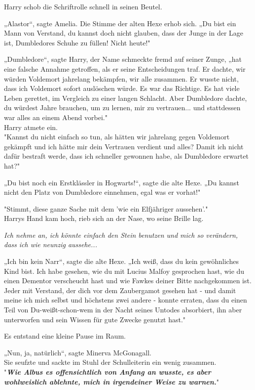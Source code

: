 {Harry schob die Schriftrolle schnell in seinen Beutel.

„Alastor“, sagte Amelia. Die Stimme der alten Hexe erhob sich. „Du bist ein Mann von Verstand, du kannst doch nicht glauben, dass der Junge in der Lage ist, Dumbledores Schuhe zu füllen! Nicht heute!"

„Dumbledore“, sagte Harry, der Name schmeckte fremd auf seiner Zunge, „hat eine falsche Annahme getroffen, als er seine Entscheidungen traf. Er dachte, wir würden Voldemort jahrelang bekämpfen, wir alle zusammen. Er wusste nicht, dass ich Voldemort sofort auslöschen würde. Es war das Richtige. Es hat viele Leben gerettet, im Vergleich zu einer langen Schlacht. Aber Dumbledore dachte, du würdest Jahre brauchen, um zu lernen, mir zu vertrauen... und stattdessen war alles an einem Abend vorbei."\\ Harry atmete ein.\\ "Kannst du nicht einfach so tun, als hätten wir jahrelang gegen Voldemort gekämpft und ich hätte mir dein Vertrauen verdient und alles? Damit ich nicht dafür bestraft werde, dass ich schneller gewonnen habe, als Dumbledore erwartet hat?"

„Du bist noch ein Erstklässler in Hogwarts!“, sagte die alte Hexe. „Du kannst nicht den Platz von Dumbledore einnehmen, egal was er vorhat!"

"Stimmt, diese ganze Sache mit dem 'wie ein Elfjähriger aussehen'."\\ Harrys Hand kam hoch, rieb sich an der Nase, wo seine Brille lag.

\emph{Ich nehme an, ich könnte einfach den Stein benutzen und mich so verändern, dass ich wie neunzig aussehe...}

„Ich bin kein Narr“, sagte die alte Hexe. „Ich weiß, dass du kein gewöhnliches Kind bist. Ich habe gesehen, wie du mit Lucius Malfoy gesprochen hast, wie du einen Dementor verscheucht hast und wie Fawkes deiner Bitte nachgekommen ist.\\ Jeder mit Verstand, der dich vor dem Zaubergamot gesehen hat - und damit meine ich mich selbst und höchstens zwei andere - konnte erraten, dass du einen Teil von Du-weißt-schon-wem in der Nacht seines Untodes absorbiert, ihn aber unterworfen und sein Wissen für gute Zwecke genutzt hast."

Es entstand eine kleine Pause im Raum.

„Nun, ja, natürlich“, sagte Minerva McGonagall.\\ Sie seufzte und sackte im Stuhl der Schulleiterin ein wenig zusammen.\\ "\textbf{\emph{Wie Albus es offensichtlich von Anfang an wusste, es aber wohlweislich ablehnte, mich in irgendeiner Weise zu warnen.}}"

}
